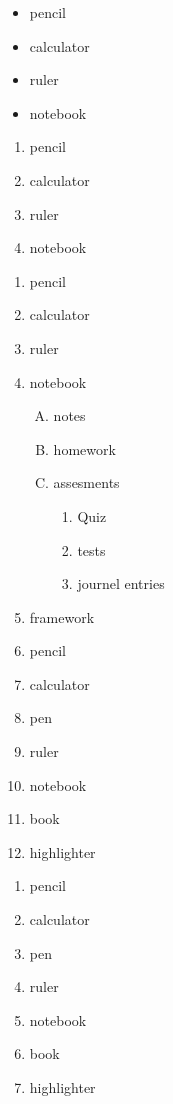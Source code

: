 \documentclass{article}
\begin{document}
\begin{itemize}
    \item pencil
    \item calculator
    \item ruler
    \item notebook
\end{itemize}
\begin{enumerate}
    \item pencil
    \item calculator
    \item ruler
    \item notebook
\end{enumerate}

\begin{enumerate}
    \item pencil
    \item calculator
    \item ruler
    \item notebook
        \begin{enumerate}[A.]
            \item notes
            \item homework
            \item assesments
                \begin{enumerate}
                    \item Quiz
                    \item tests
                    \item journel entries
                    
                \end{enumerate}
        \end{enumerate}
        \item framework
\end{enumerate}
\begin{enumerate}\setcounter{enumi}{5}
    \item pencil
    \item calculator
    \item pen
    \item ruler
    \item notebook
    \item book
    \item highlighter
\end{enumerate}
\pagebreak

\begin{enumerate}
    \item[a)] pencil %
    \item[b] calculator
    \item[] pen
    \item[] ruler
    \item[] notebook
    \item[] book
    \item[] highlighter
\end{enumerate}
\end{document}
